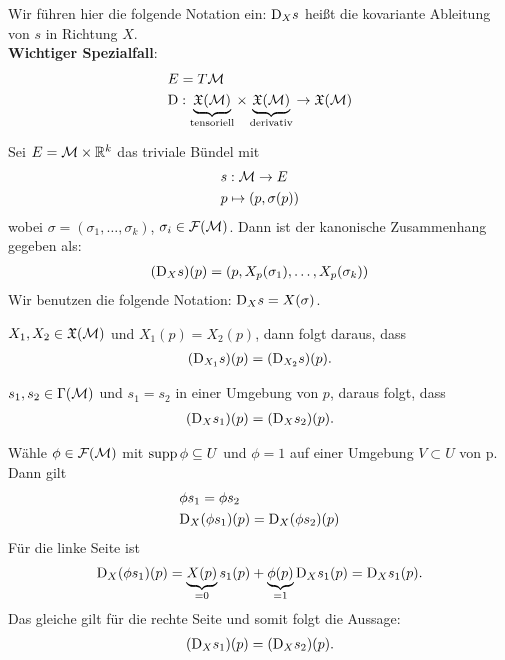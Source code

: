 Wir führen hier die folgende Notation ein:
$\mathrm{D}_X s$ heißt die kovariante Ableitung von $s$ in Richtung $X$.\\
\textbf{Wichtiger Spezialfall}:
\begin{align}
&E = T\mathcal{M}\\
&\mathrm{D}: \underbrace{\mathfrak{X}(\mathcal{M})}_{\mathrm{tensoriell}} \times \underbrace{\mathfrak{X}(\mathcal{M})}_{\mathrm{derivativ}} \to \mathfrak{X}(\mathcal{M})
\end{align}

\begin{bsp}
Sei $E = \mathcal{M} \times \mathbb{R}^k$ das triviale Bündel mit
\begin{align}
&s: \mathcal{M} \to E \\
&p \mapsto (p, \sigma(p))
\end{align}
wobei $\sigma = (\sigma_1, \dots, \sigma_k)$, $\sigma_i \in \mathcal{F}(\mathcal{M})$.
Dann ist der kanonische Zusammenhang gegeben als:
\begin{align}
(\mathrm{D}_X s)(p) = (p, X_p(\sigma_1), \dots, X_p(\sigma_k))
\end{align}
Wir benutzen die folgende Notation: $\mathrm{D}_X s = X(\sigma)$.
\end{bsp}

\begin{lem}
\label{lem:lokalisierung1}
$X_1, X_2 \in \mathfrak{X}(\mathcal{M})$ und $X_1(p) = X_2(p)$,
dann folgt daraus, dass 
\begin{align}
(\mathrm{D}_{X_1} s)(p) = (\mathrm{D}_{X_2} s) (p).
\end{align}

\end{lem}

\begin{lem}
\label{lem:lokalisierung2}
$s_1, s_2 \in \Gamma(\mathcal{M})$ und $s_1 = s_2$ in einer Umgebung von $p$,
daraus folgt, dass
\begin{align}
(\mathrm{D}_{X} s_1)(p) = (\mathrm{D}_{X} s_2) (p).
\end{align}
\end{lem}

\begin{bew}
Wähle $\phi \in \mathcal{F}(\mathcal{M})$ mit $\operatorname{supp} \phi \subseteq U$ und $\phi = 1$ auf einer Umgebung $V \subset U$ von p.
Dann gilt 
\begin{align}
&\phi s_1 = \phi s_2 \\
&\mathrm{D}_X(\phi s_1)(p) = \mathrm{D}_X(\phi s_2)(p)
\end{align}
Für die linke Seite ist
\begin{align}
\mathrm{D}_X(\phi s_1)(p) = \underbrace{X(p)}_{=0} s_1(p) + \underbrace{\phi(p)}_{=1} \mathrm{D}_X s_1(p) = \mathrm{D}_X s_1 (p).
\end{align}
Das gleiche gilt für die rechte Seite und somit folgt die Aussage:
\begin{align}
(\mathrm{D}_{X} s_1)(p) = (\mathrm{D}_{X} s_2) (p).
\end{align}
\end{bew}
